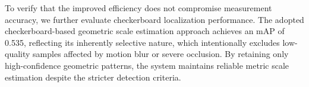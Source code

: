 \documentclass{article}
\begin{document}
To verify that the improved efficiency does not compromise measurement accuracy, we further evaluate checkerboard localization performance. The adopted checkerboard-based geometric scale estimation approach achieves an mAP of 0.535, reflecting its inherently selective nature, which intentionally excludes low-quality samples affected by motion blur or severe occlusion. By retaining only high-confidence geometric patterns, the system maintains reliable metric scale estimation despite the stricter detection criteria.



\end{document}
